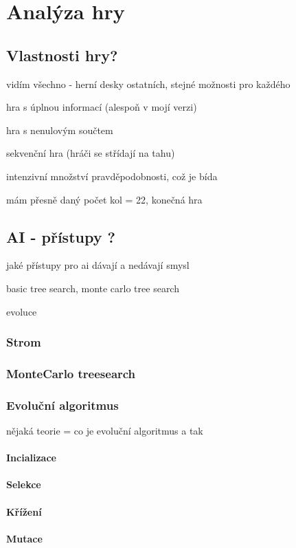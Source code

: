 \chapter{Analýza hry}

\section{Vlastnosti hry?}
vidím všechno - herní desky ostatních, stejné možnosti pro každého

hra s úplnou informací (alespoň v mojí verzi)

hra s nenulovým součtem

sekvenční hra (hráči se střídají na tahu)

intenzivní množství pravděpodobnosti, což je bída

mám přesně daný počet kol = 22, konečná hra


\section{AI - přístupy ?}
jaké přístupy pro ai dávají a nedávají smysl

basic tree search, monte carlo tree search

evoluce
\subsection{Strom}
\subsection{MonteCarlo treesearch}

\subsection{Evoluční algoritmus}
nějaká teorie = co je evoluční algoritmus a tak
\subsubsection*{Incializace}
\subsubsection*{Selekce}
\subsubsection*{Křížení}
\subsubsection*{Mutace}

